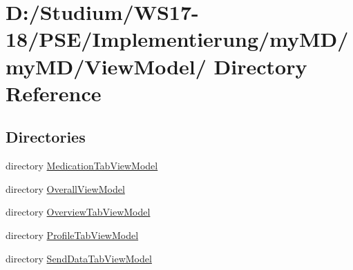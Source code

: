 \hypertarget{dir_D_3A_2FStudium_2FWS17_2D18_2FPSE_2FImplementierung_2FmyMD_2FmyMD_2FViewModel_2F}{
\section{D:/Studium/WS17-18/PSE/Implementierung/my\-MD/my\-MD/View\-Model/ Directory Reference}
\label{dir_D_3A_2FStudium_2FWS17_2D18_2FPSE_2FImplementierung_2FmyMD_2FmyMD_2FViewModel_2F}
}


\subsection*{Directories}
\begin{CompactItemize}
\item 
directory \hyperlink{dir_D_3A_2FStudium_2FWS17_2D18_2FPSE_2FImplementierung_2FmyMD_2FmyMD_2FViewModel_2FMedicationTabViewModel_2F}{Medication\-Tab\-View\-Model}
\item 
directory \hyperlink{dir_D_3A_2FStudium_2FWS17_2D18_2FPSE_2FImplementierung_2FmyMD_2FmyMD_2FViewModel_2FOverallViewModel_2F}{Overall\-View\-Model}
\item 
directory \hyperlink{dir_D_3A_2FStudium_2FWS17_2D18_2FPSE_2FImplementierung_2FmyMD_2FmyMD_2FViewModel_2FOverviewTabViewModel_2F}{Overview\-Tab\-View\-Model}
\item 
directory \hyperlink{dir_D_3A_2FStudium_2FWS17_2D18_2FPSE_2FImplementierung_2FmyMD_2FmyMD_2FViewModel_2FProfileTabViewModel_2F}{Profile\-Tab\-View\-Model}
\item 
directory \hyperlink{dir_D_3A_2FStudium_2FWS17_2D18_2FPSE_2FImplementierung_2FmyMD_2FmyMD_2FViewModel_2FSendDataTabViewModel_2F}{Send\-Data\-Tab\-View\-Model}
\end{CompactItemize}
